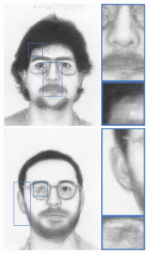 \documentclass[10pt,twocolumn,letterpaper]{article}
\begin{document}
\begin{figure}[htbp]
{\begin{minipage}[b]{0.13\linewidth}
\includegraphics[width=0.99\linewidth]{img/sketch_result/mwf_s3.png}
\includegraphics[width=0.99\linewidth]{img/sketch_result/mwf_s4.png}
\end{minipage}
}
\end{figure}
\end{document}
